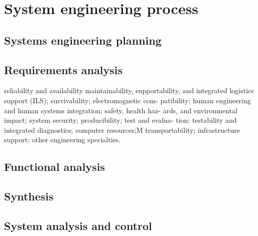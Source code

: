 \chapter{System engineering process}

\section{Systems engineering planning}










\section{Requirements analysis}
reliability and availability
maintainability, 
supportability, and integrated logistics support (ILS); survivability; electromagnetic com-
patibility; human engineering and human systems integration; safety, health haz-
ards, and environmental impact; system security; producibility; test and evalua-
tion; testability and integrated diagnostics; computer resources;M transportability;
infrastructure support; other engineering specialties.

\section{Functional analysis}

\section{Synthesis}

\section{System analysis and control}